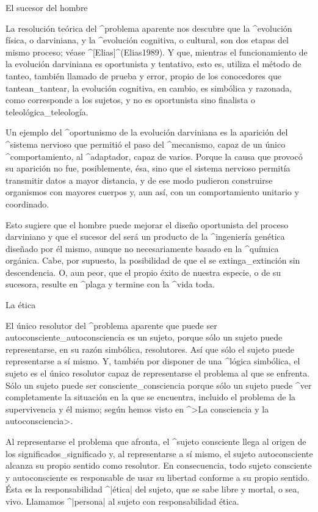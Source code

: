 \Section El sucesor del hombre

La resolución teórica del ^{problema aparente} nos descubre que la
^{evolución física}, o darviniana, y la ^{evolución cognitiva}, o
cultural, son dos etapas del mismo proceso; véase ^[Elias]^(Elias1989).
Y que, mientras el funcionamiento de la evolución darviniana es
oportunista y tentativo, esto es, utiliza el método de tanteo, también
llamado de prueba y error, propio de los conocedores que
tantean_{tantear}, la evolución cognitiva, en cambio, es simbólica y
razonada, como corresponde a los sujetos, y no es oportunista sino
finalista o teleológica_{teleología}.

Un ejemplo del ^{oportunismo} de la evolución darviniana es la aparición
del ^{sistema nervioso} que permitió el paso del ^{mecanismo}, capaz de
un único ^{comportamiento}, al ^{adaptador}, capaz de varios. Porque la
causa que provocó su aparición no fue, posiblemente, ésa, sino que el
sistema nervioso permitía transmitir datos a mayor distancia, y de ese
modo pudieron construirse organismos con mayores cuerpos y, aun así, con
un comportamiento unitario y coordinado.

Esto sugiere que el hombre puede mejorar el diseño oportunista del
proceso darviniano y que el sucesor del  será un
producto de la ^{ingeniería} genética diseñado por él mismo, aunque no
necesariamente basado en la ^{química orgánica}. Cabe, por supuesto, la
posibilidad de que el  se extinga_{extinción} sin
descendencia. O, aun peor, que el propio éxito de nuestra especie, o de
su sucesora, resulte en ^{plaga} y termine con la ^{vida} toda.



\Section La ética

El único resolutor del ^{problema aparente} que puede ser
autoconsciente_{autoconsciencia} es un sujeto, porque sólo un sujeto
puede representarse, en su razón simbólica, resolutores. Así que sólo el
sujeto puede representarse a sí mismo. Y, también por disponer de una
^{lógica simbólica}, el sujeto es el único resolutor capaz de
representarse el problema al que se enfrenta. Sólo un sujeto puede ser
consciente_{consciencia} porque sólo un sujeto puede ^{ver}
completamente la situación en la que se encuentra, incluido el problema
de la supervivencia y él mismo; según hemos visto en ^>La consciencia y
la autoconsciencia>.

Al representarse el problema que afronta, el ^{sujeto} consciente llega
al origen de los significados_{significado} y, al representarse a sí
mismo, el sujeto autoconsciente alcanza su propio sentido como
resolutor. En consecuencia, todo sujeto consciente y autoconsciente es
responsable de usar su libertad conforme a su propio sentido. Ésta es la
responsabilidad ^|ética| del sujeto, que se sabe libre y mortal, o sea,
vivo. Llamamos ^|persona| al sujeto con responsabilidad ética.

